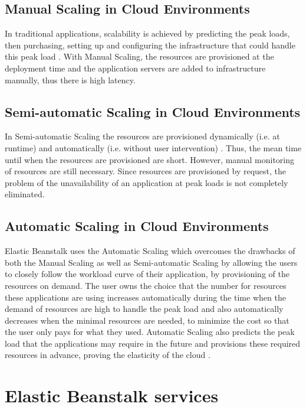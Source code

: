\documentclass[9pt,twocolumn,twoside]{../../styles/osajnl}
\begin{document}
\subsection{Manual Scaling in Cloud Environments}

In traditional applications, scalability is achieved by predicting the
peak loads, then purchasing, setting up and configuring the
infrastructure that could handle this peak load
\cite{ManualScaling}. With Manual Scaling, the resources are
provisioned at the deployment time and the application servers are
added to infrastructure manually, thus there is high latency.

\subsection{Semi-automatic Scaling in Cloud Environments}

In Semi-automatic Scaling the resources are provisioned
dynamically (i.e. at runtime) and  automatically (i.e. without user
intervention) \cite{elastic-beanstalk}. Thus, the mean time until when
the resources are provisioned are short.  However, manual monitoring
of resources are still necessary. Since resources are
provisioned by request, the problem of the unavailability of an
application at peak loads is not completely eliminated.

\subsection{Automatic Scaling in Cloud Environments}

Elastic Beanstalk uses the Automatic Scaling which overcomes the
drawbacks of both the Manual Scaling as well as Semi-automatic Scaling
by allowing the users to closely follow the workload curve of their
application, by provisioning of the resources on demand. The user owns
the choice that the number for resources these applications are using
increases automatically during the time when the demand of resources
are high to handle the peak load and also automatically decreases when
the minimal resources are needed, to minimize the cost so that the
user only pays for what they used. Automatic Scaling also predicts the
peak load that the applications may require in the future and
provisions these required resources in advance, proving the elasticity
of the cloud \cite{elastic-beanstalk}.


\section{Elastic Beanstalk services}
\end{document}
